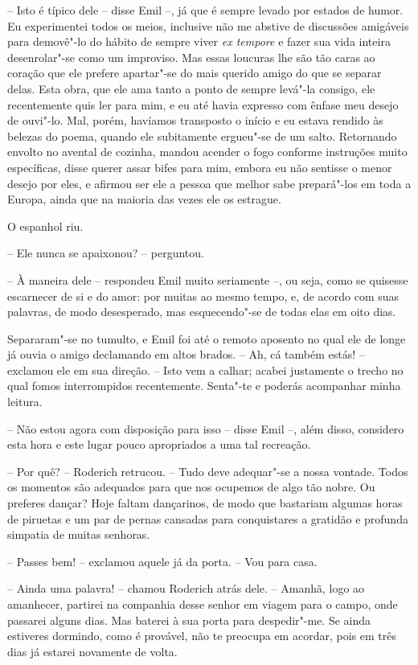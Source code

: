 -- Isto é típico dele -- disse Emil --, já que é sempre levado por
estados de humor. Eu experimentei todos os meios, inclusive não me
abstive de discussões amigáveis para demovê"-lo do hábito de sempre
viver \textit{ex tempore} e fazer sua vida inteira desenrolar"-se como
um improviso. Mas essas loucuras lhe são tão caras ao coração que ele
prefere apartar"-se do mais querido amigo do que se separar delas. Esta
obra, que ele ama tanto a ponto de sempre levá"-la consigo, ele
recentemente quis ler para mim, e eu até havia expresso com ênfase meu
desejo de ouvi"-lo. Mal, porém, havíamos transposto o início e eu estava
rendido às belezas do poema, quando ele subitamente ergueu"-se de um
salto. Retornando envolto no avental de cozinha, mandou acender o fogo
conforme instruções muito específicas, disse querer assar bifes para
mim, embora eu não sentisse o menor desejo por eles, e afirmou ser ele
a pessoa que melhor sabe prepará"-los em toda a Europa, ainda que na
maioria das vezes ele os estrague.

O espanhol riu.

-- Ele nunca se apaixonou? -- perguntou.

-- À maneira dele -- respondeu Emil muito seriamente --, ou seja, como
se quisesse escarnecer de si e do amor: por muitas ao mesmo tempo, e,
de acordo com suas palavras, de modo desesperado, mas esquecendo"-se de
todas elas em oito dias.

Separaram"-se no tumulto, e Emil foi até o remoto aposento no qual ele de
longe já ouvia o amigo declamando em altos brados.
\pagebreak
-- Ah, cá também estás! -- exclamou ele em sua direção. -- Isto vem a
calhar; acabei justamente o trecho no qual fomos interrompidos
recentemente. Senta"-te e poderás acompanhar minha leitura.

-- Não estou agora com disposição para isso -- disse Emil --, além
disso, considero esta hora e este lugar pouco apropriados a uma tal
recreação.

-- Por quê? -- Roderich retrucou. -- Tudo deve adequar"-se a nossa
vontade. Todos os momentos são adequados para que nos ocupemos de algo
tão nobre. Ou preferes dançar? Hoje faltam dançarinos, de modo que
bastariam algumas horas de piruetas e um par de pernas cansadas para
conquistares a gratidão e profunda simpatia de muitas senhoras.

-- Passes bem! -- exclamou aquele já da porta. -- Vou para casa.

-- Ainda uma palavra! -- chamou Roderich atrás dele. -- Amanhã, logo ao
amanhecer, partirei na companhia desse senhor em viagem para o campo,
onde passarei alguns dias. Mas baterei à sua porta para despedir"-me. Se
ainda estiveres dormindo, como é provável, não te preocupa em acordar,
pois em três dias já estarei novamente de volta. 

